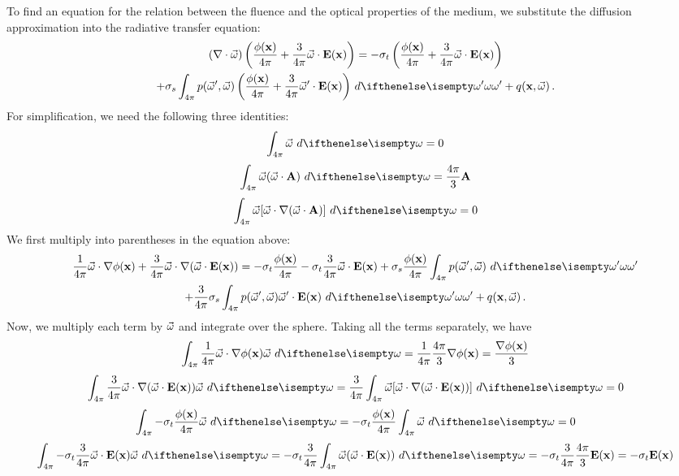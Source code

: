 \documentclass[10pt,a4paper]{article}
\begin{document}
To find an equation for the relation between the fluence and the optical properties of the medium, we substitute the diffusion approximation into the radiative transfer equation:
\begin{multline*}
(\nablavec \cdot \omegavec) \left(\frac{\xfunc{\phi}}{4\pi} + \frac{3}{4\pi} \omegavec \cdot \xvecfunc{E}\right)
= -\extinction\left(\frac{\xfunc{\phi}}{4\pi} + \frac{3}{4\pi} \omegavec \cdot \xvecfunc{E}\right)
 \\+ \scattering \sphere {p(\omegavec', \omegavec) \left(\frac{\xfunc{\phi}}{4\pi} + \frac{3}{4\pi} \omegavec' \cdot\xvecfunc{E}\right)}{\omega'}
 + \xomegafunc{q} \, .
\end{multline*}
For simplification, we need the following three identities:
$$
\sphere{\omegavec}{} = 0
$$
\begin{equation}
\sphere{\omegavec (\omegavec \cdot \mathbf{A}) }{} = \frac{4 \pi}{3} \mathbf{A}
\label{eq:id1}
\end{equation}
$$
\sphere{\omegavec [ \omegavec \cdot \nablavec(\omegavec \cdot \mathbf{A})]}{} = 0
$$
We first multiply into parentheses in the equation above:
\begin{multline*}
\frac{1}{4\pi} \omegavec \cdot \nablavec \xfunc{\phi} + \frac{3}{4\pi} \omegavec \cdot \nablavec (\omegavec \cdot \xvecfunc{E})
= -\extinction\frac{\xfunc{\phi}}{4\pi}  -\extinction\frac{3}{4\pi} \omegavec \cdot \xvecfunc{E} + \scattering \frac{\xfunc{\phi}}{4\pi} \sphere {p(\omegavec', \omegavec)}{\omega'}
 \\+ \frac{3}{4\pi} \scattering  \sphere {p(\omegavec', \omegavec)  \omegavec' \cdot \xvecfunc{E}}{\omega'}
 + \xomegafunc{q} \, .
\end{multline*}
Now, we multiply each term by $\vec{\omega}$ and integrate over the sphere. Taking all the terms separately, we have
$$
\sphere{\frac{1}{4\pi} \omegavec \cdot \nablavec \xfunc{\phi}\omegavec}{} = \frac{1}{4\pi} \frac{4\pi}{3} \nablavec \xfunc{\phi} = \frac{\nablavec \xfunc{\phi}}{3}
$$
$$
\sphere{\frac{3}{4\pi} \omegavec \cdot \nablavec (\omegavec \cdot \xvecfunc{E}) \omegavec}{} = \frac{3}{4\pi} \sphere{\omegavec [\omegavec \cdot \nablavec (\omegavec \cdot \xvecfunc{E})] }{} = 0
$$
$$
\sphere{-\extinction\frac{\xfunc{\phi}}{4\pi} \omegavec}{} = -\extinction\frac{\xfunc{\phi}}{4\pi} \sphere{\omegavec}{} =  0
$$
$$
\sphere{-\extinction\frac{3}{4\pi} \omegavec \cdot \xvecfunc{E} \omegavec}{} = -\extinction \frac{3}{4\pi} \sphere{ \omegavec (\omegavec \cdot \xvecfunc{E})}{} = -\extinction\frac{3}{4\pi} \frac{4\pi}{3} \xvecfunc{E} = -\extinction \xvecfunc{E}
$$
\end{document}
